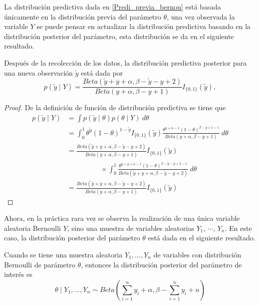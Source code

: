 \documentclass[10pt,openright]{book}\usepackage[]{graphicx}\usepackage[]{color}
\begin{document}
    La distribuci\'on predictiva dada en \ref{Predi_previa_bernou} est\'a basada \'unicamente en la distribuci\'on previa del par\'ametro $\theta$, una vez observada la variable $Y$ se puede pensar en actualizar la distribuci\'on predictiva basando en la distribuci\'on posterior del par\'ametro, esta distribuci\'on se da en el siguiente resultado.
    
    \begin{Res}
    Despu\'es de la recolecci\'on de los datos, la distribuci\'on predictiva posterior para una nueva observaci\'on $\tilde{y}$ est\'a dada por
    \begin{equation}
    p(\tilde{y} \mid Y)=\frac{Beta(\tilde{y}+y+\alpha,\beta-\tilde{y}-y+2)}{Beta(y+\alpha,\beta-y+1)}I_{\{0,1\}}(\tilde{y}),
    \end{equation}
    \end{Res}
    
    \begin{proof}
    De la definici\'on de funci\'on de distribuci\'on predictiva se tiene que
    \begin{align*}
    p(\tilde{y} \mid Y)&=\int p(\tilde{y} \mid \theta)p(\theta \mid Y)\ d\theta\\
    &=\int_0^1\theta^{\tilde{y}}(1-\theta)^{1-\tilde{y}}I_{\{0,1\}}(\tilde{y})
    \frac{\theta^{y+\alpha-1}(1-\theta)^{\beta-y+1-1}}{Beta(y+\alpha,\beta-y+1)}\ d\theta\\
    &=\frac{Beta(\tilde{y}+y+\alpha,\beta-\tilde{y}-y+2)}{Beta(y+\alpha,\beta-y+1)}I_{\{0,1\}}(\tilde{y})\\
    &\hspace{2cm}\times \int_0^1\frac{\theta^{\tilde{y}+y+\alpha-1}(1-\theta)^{\beta-\tilde{y}-y+2-1}}
    {Beta(\tilde{y}+y+\alpha,\beta-\tilde{y}-y+2)}\ d\theta\\
    &=\frac{Beta(\tilde{y}+y+\alpha,\beta-\tilde{y}-y+2)}{Beta(y+\alpha,\beta-y+1)}I_{\{0,1\}}(\tilde{y})
    \end{align*}
    \end{proof}
    
    Ahora, en la pr\'actica rara vez se observa la realizaci\'on de una \'unica variable aleatoria Bernoulli $Y$, sino una muestra de variables aleatorias $Y_1$, $\cdots$, $Y_n$. En este caso, la distribuci\'on posterior del par\'ametro $\theta$ est\'a dada en el siguiente resultado.
    
    \begin{Res}
    Cuando se tiene una muestra aleatoria $Y_1,\ldots,Y_n$ de variables con distribuci\'on Bernoulli de par\'ametro $\theta$, entonces la distribuci\'on posterior del par\'ametro de inter\'es es
    \begin{equation*}
    \theta \mid Y_1,\ldots,Y_n \sim Beta\left(\sum_{i=1}^ny_i+\alpha,\beta-\sum_{i=1}^ny_i+n\right)
    \end{equation*}
    \end{Res}
    
\end{document}
